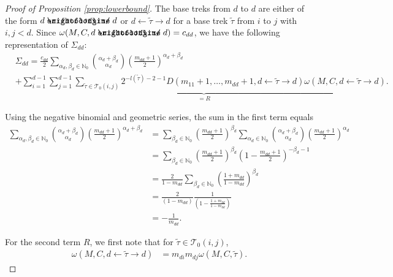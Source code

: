\documentclass[10pt,twoside,a4paper]{amsart}
\DeclareRobustCommand{\unEdge}{%
	\mathrel{%
		\text{%
			\ooalign{$\rightfootline$\cr\reflectbox{$\rightfootline$}\cr}%
		}%
	}%
}
\begin{document}
\begin{proof}[Proof of Proposition \ref{prop:lowerbound}] The base treks from $d$ to $d$ are either of the form 
    $d \unEdge d$ or $d \leftarrow \tilde{\tau} \rightarrow d$ for a 
    base trek $\tilde{\tau}$ from $i$ to $j$ with $i, j < d$.
    Since $\omega(M, C, d \unEdge d) = c_{dd}$, we have
     the following representation of $\Sigma_{dd}$:
    \begin{align*}
        & \Sigma_{dd} = \frac{c_{dd}}{2} \sum_{\alpha_d, \beta_d \in \mathbb{N}_0} 
        {\alpha_d + \beta_d \choose \alpha_d} \left(\frac{m_{dd} + 1}{2}\right)^{\alpha_d + \beta_d} \\
        &  + 
        \underbrace{\sum_{i = 1}^{d - 1} \sum_{j= 1}^{d-1} \sum_{\tilde{\tau} \in \mathcal{T}_0(i, j)} 
        2^{-l(\tilde{\tau}) - 2 - 1} D(m_{11} + 1, \ldots, m_{dd} + 1, d \leftarrow \tilde{\tau} \rightarrow d)
        \omega(M, C, d \leftarrow \tilde{\tau} \rightarrow d)}_{= R}.
    \end{align*}

    Using the negative binomial and geometric series, the sum in the first term equals
    \begin{align*}
        \sum_{\alpha_d, \beta_d \in \mathbb{N}_0} 
        {\alpha_d + \beta_d \choose \alpha_d} \left(\frac{m_{dd} + 1}{2}\right)^{\alpha_d + \beta_d}
        & = \sum_{\beta_d \in \mathbb{N}_0} \left(\frac{m_{dd} + 1}{2}\right)^{\beta_d}   
        \sum_{\alpha_d \in \mathbb{N}_0}   {\alpha_d + \beta_d \choose \alpha_d} \left(\frac{m_{dd} + 1}{2}\right)^{\alpha_d} \\
        & = \sum_{\beta_d \in \mathbb{N}_0} \left(\frac{m_{dd} + 1}{2}\right)^{\beta_d}
        \left(1 - \frac{m_{dd} + 1}{2}\right)^{- \beta_d - 1}
        \\
        & = \frac{2}{1 - m_{dd}} \sum_{\beta_d \in \mathbb{N}_0} \left(\frac{1 + m_{dd}}{1 - m_{dd}}\right)^{\beta_d}
        \\
        & =  \frac{2}{(1 - m_{dd})} \frac{1}{\left(1 - \frac{1 + m_{dd}}{1 - m_{dd}}\right)} \\
        & = - \frac{1}{m_{dd}}. 
    \end{align*}

    For the second term $R$, we first note that for $\tilde{\tau} \in \mathcal{T}_0(i, j)$,
    \begin{align*}
        \omega(M, C, d \leftarrow \tilde{\tau} \rightarrow d) & = 
        m_{di} m_{dj} \omega(M, C, \tilde{\tau}). 
    \end{align*}


\end{proof}
\end{document}
